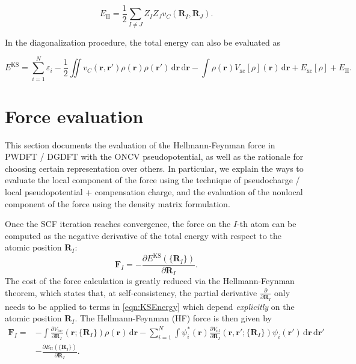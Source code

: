 \documentclass{article}
\newcommand{\bvec}[1]{\mathbf{#1}}
\newcommand{\vr}{\bvec{r}}
\newcommand{\vF}{\bvec{F}}
\newcommand{\vR}{\bvec{R}}
\newcommand{\ud}{\,\mathrm{d}}
\newcommand{\II}{\mathrm{II}}
\newcommand{\xc}{\mathrm{xc}}
\theoremstyle{plain}
\theoremstyle{remark}
\theoremstyle{plain}
\theoremstyle{plain}
\theoremstyle{plain}
\begin{document}
\begin{equation}
E_{\II}=\frac12 \sum_{I\ne J} Z_I Z_J v_C(\vR_I,\vR_J).
\label{eqn:ionionenergy}
\end{equation}

In the diagonalization procedure, the total energy can also be evaluated as

\begin{equation}
  E^{\text{KS}}=\sum_{i=1}^N \varepsilon_i - \frac{1}{2} \iint v_C(\vr,\vr')\rho(\vr) \rho(\vr') \ud \vr \ud \vr-\int
    \rho(\vr)V_{\xc}[\rho](\vr) \ud \vr+E_{\xc}[\rho] + E_{\II}.
  \label{eqn:KSEnergy2}
\end{equation}

 
\section{Force evaluation}\label{sec:force}

This section documents the evaluation of the Hellmann-Feynman force in PWDFT / DGDFT with the ONCV pseudopotential, as well as the rationale for choosing certain representation over others. In particular, we explain the ways to evaluate the local component of the force using the technique of pseudocharge / local pseudopotential + compensation charge, and the evaluation of the nonlocal component of the force using the density matrix formulation.

Once the SCF iteration
reaches convergence, the force on the $I$-th atom can be
computed as the negative derivative of the total energy with respect to
the atomic position $\vR_{I}$:
\begin{equation}
  \vF_{I} = -\frac{\partial E^{\text{KS}}(\{\vR_{I}\})}{\partial
  \vR_{I}}.
  \label{eqn:forceDef}
\end{equation}
The cost of the force calculation is
greatly reduced via the Hellmann-Feynman theorem,
which states that, at self-consistency,
the partial derivative $\frac{\partial}{\partial \vR_{I}}$ only needs to be applied to
terms in \cref{eqn:KSEnergy} which depend \textit{explicitly} on the
atomic position $\vR_{I}$. The Hellmann-Feynman (HF) force is then given by
\begin{equation}
  \begin{split}
    \vF_{I} = &-\int \frac{\partial
    V_{\text{loc}}}{\partial \vR_{I}}(\vr;\{\vR_{I}\}) \rho(\vr) \ud \vr
    - \sum_{i=1}^{N} \int \psi_{i}^{*}(\vr)
    \frac{\partial V_{\text{nl}}}{\partial \vR_{I}}(\vr,\vr';\{\vR_{I}\})
    \psi_{i}(\vr') \ud \vr \ud \vr'\\
    &-\frac{\partial E_{\II}(\{\vR_{I}\})}{\partial
  \vR_{I}}.
  \end{split}
  \label{eqn:forceHF1}
\end{equation}
\end{document}
